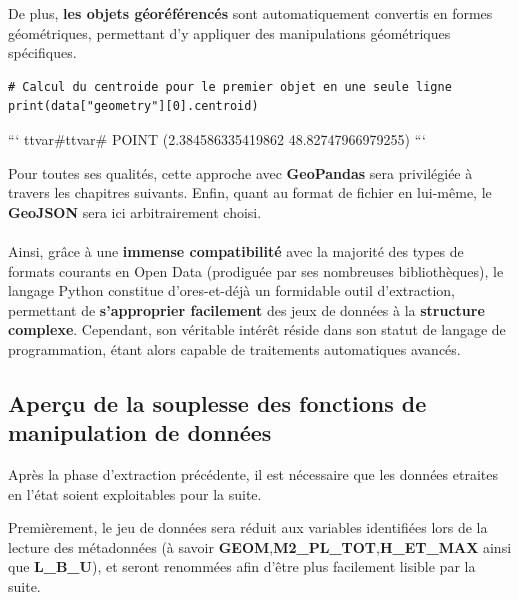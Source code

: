 \documentclass[
  11pt,
  french,
]{article}
\begin{document}
De plus, \textbf{les objets géoréférencés} sont automatiquement
convertis en formes géométriques, permettant d'y appliquer des
manipulations géométriques spécifiques.

\begin{tcolorbox}[title= Chargement du jeu de données sous un format géographique dans Python ,colback=boitecode]
\begin{lstlisting}[style=code]
# Calcul du centroide pour le premier objet en une seule ligne
print(data["geometry"][0].centroid)\end{lstlisting}

```
ttvar{#}ttvar{#} POINT (2.384586335419862 48.82747966979255)
```

\end{tcolorbox}

Pour toutes ses qualités, cette approche avec \textbf{GeoPandas} sera
privilégiée à travers les chapitres suivants. Enfin, quant au format de
fichier en lui-même, le \textbf{GeoJSON} sera ici arbitrairement
choisi.\\
~\\
Ainsi, grâce à une \textbf{immense compatibilité} avec la majorité des
types de formats courants en Open Data (prodiguée par ses nombreuses
bibliothèques), le langage Python constitue d'ores-et-déjà un formidable
outil d'extraction, permettant de \textbf{s'approprier facilement} des
jeux de données à la \textbf{structure complexe}. Cependant, son
véritable intérêt réside dans son statut de langage de programmation,
étant alors capable de traitements automatiques avancés.

\newpage

\hypertarget{aperuxe7u-de-la-souplesse-des-fonctions-de-manipulation-de-donnuxe9es}{%
\subsection{Aperçu de la souplesse des fonctions de manipulation de
données}\label{aperuxe7u-de-la-souplesse-des-fonctions-de-manipulation-de-donnuxe9es}}

Après la phase d'extraction précédente, il est nécessaire que les
données etraites en l'état soient exploitables pour la suite.

Premièrement, le jeu de données sera réduit aux variables identifiées
lors de la lecture des métadonnées (à savoir
\textbf{GEOM},\textbf{M2\_PL\_TOT},\textbf{H\_ET\_MAX} ainsi que
\textbf{L\_B\_U}), et seront renommées afin d'être plus facilement
lisible par la suite.
\end{document}
